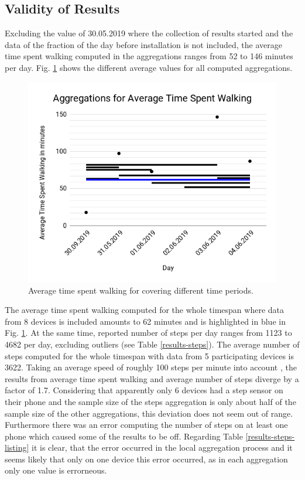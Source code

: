 \subsection{Validity of Results}
Excluding the value of 30.05.2019 where the collection of results started and the data of the fraction of the day before installation is not included, the average time spent walking computed in the aggregations ranges from 52 to 146 minutes per day. Fig. \ref{time-walking-diagram} shows the different average values for all computed aggregations. 

\begin{figure}[h!]
	\includegraphics[width=\textwidth]{data/diagrams/average-time-walking2.png}
	\caption{Average time spent walking for covering different time periods.}
	\label{time-walking-diagram}
\end{figure}

The average time spent walking computed for the whole timespan where data from 8 devices is included amounts to 62 minutes and is highlighted in blue in Fig. \ref{time-walking-diagram}. At the same time, reported number of steps per day ranges from 1123 to 4682 per day, excluding outliers (see Table \ref{results-steps}). The average number of steps computed for the whole timespan with data from 5 participating devices is 3622. Taking an average speed of roughly 100 steps per minute into account \parencite{steps2}, the results from average time spent walking and average number of steps diverge by a factor of 1.7. Considering that apparently only 6 devices had a step sensor on their phone and the sample size of the steps aggregation is only about half of the sample size of the other aggregations, this deviation does not seem out of range. Furthermore there was an error computing the number of steps on at least one phone which caused some of the results to be off. Regarding Table \ref{results-steps-listing} it is clear, that the error occurred in the local aggregation process and it seems likely that only on one device this error occurred, as in each aggregation only one value is errorneous.

